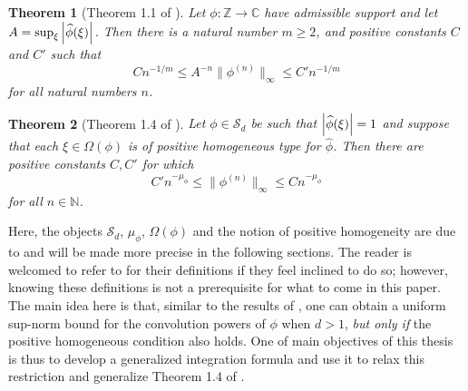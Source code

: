 \documentclass[11pt, letter]{book}
\newtheorem{theorem}{Theorem}[section]
\begin{document}
\begin{framed}
\begin{theorem}[Theorem 1.1 of \cite{randles_convolution_2015}]
Let $\phi : \mathbb{Z} \to \mathbb{C}$ have admissible support and let $A = \sup_\xi \abs{\widehat{\phi}(\xi)}$. Then there is a natural number $m \geq 2$, and positive constants $C$ and $C'$ such that 
\begin{equation*}
    Cn^{-1/m} \leq A^{-n}\| \phi^{(n)} \|_\infty \leq C' n^{-1/m}
\end{equation*}
for all natural numbers $n$.
\end{theorem}

\begin{theorem}[Theorem 1.4 of \cite{randles_convolution_2017}]
Let $\phi \in \mathcal{S}_d$ be such that $\abs{\widehat{\phi}(\xi)} = 1$ and suppose that each $\xi \in \Omega(\phi)$ is of positive homogeneous type for $\widehat{\phi}$. Then there are positive constants $C,C'$ for which 
\begin{equation*}
    C'n^{-\mu_\phi} \leq \| \phi^{(n)} \|_\infty \leq C n^{-\mu_\phi}
\end{equation*}
for all $n\in \mathbb{N}$.
\end{theorem}
\end{framed}
Here, the objects $\mathcal{S}_d$, $\mu_\phi$, $\Omega(\phi)$ and the notion of positive homogeneity are due to \cite{randles_convolution_2017} and will be made more precise in the following sections. The reader is welcomed to refer to \cite{randles_convolution_2017} for their definitions if they feel inclined to do so; however, knowing these definitions is not a prerequisite for what to come in this paper. The main idea here is that, similar to the results of \cite{randles_convolution_2015}, one can obtain a uniform sup-norm bound for the convolution powers of $\phi$ when $d>1$, \textit{but only if} the positive homogeneous condition also holds. One of main objectives of this thesis is thus to develop a generalized integration formula and use it to relax this restriction and generalize  Theorem 1.4 of \cite{randles_convolution_2017}.
\end{document}
